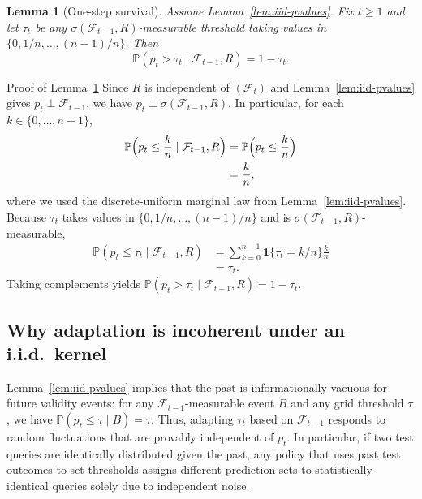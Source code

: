 \documentclass{uai2026} %
\newtheorem{lemma}{Lemma}
\newcommand{\1}{\mathbf{1}}
\newcommand{\ind}[1]{\mathbf{1}\{#1\}}
\newcommand{\prob}{\mathbb{P}}
\newcommand{\F}{\mathcal{F}}
\begin{document}
\begin{lemma}[One-step survival]
  \label{lem:one-step-survival}
  Assume Lemma~\ref{lem:iid-pvalues}.
  Fix $t\ge 1$ and let $\tau_{t}$ be any $\sigma(\F_{t-1},R)$-measurable threshold taking values in $\{0,1/n,\dots,(n-1)/n\}$.
  Then
  \begin{equation*}
    \prob(p_{t}>\tau_{t}\mid \F_{t-1},R)=1-\tau_{t}.
  \end{equation*}
\end{lemma}

\begin{appendixproof}{Proof of Lemma~\ref{lem:one-step-survival}}
  Since $R$ is independent of $(\F_{t})$ and Lemma~\ref{lem:iid-pvalues} gives $p_{t}\perp \F_{t-1}$, we have $p_{t}\perp \sigma(\F_{t-1},R)$.
  In particular, for each $k\in\{0,\dots,n-1\}$,
  \begin{equation*}
    \begin{aligned}
      \prob\Bigl(p_{t}\le \frac{k}{n}\mid \F_{t-1},R\Bigr)
      &=
      \prob\Bigl(p_{t}\le \frac{k}{n}\Bigr)\\
      &=
      \frac{k}{n},
    \end{aligned}
  \end{equation*}
  where we used the discrete-uniform marginal law from Lemma~\ref{lem:iid-pvalues}.
  Because $\tau_{t}$ takes values in $\{0,1/n,\dots,(n-1)/n\}$ and is $\sigma(\F_{t-1},R)$-measurable,
  \begin{equation*}
    \begin{aligned}
      \prob(p_{t}\le \tau_{t}\mid \F_{t-1},R)
      &=
      \sum_{k=0}^{n-1}\ind{\tau_{t}=k/n}\frac{k}{n}\\
      &=
      \tau_{t}.
    \end{aligned}
  \end{equation*}
  Taking complements yields $\prob(p_{t}>\tau_{t}\mid \F_{t-1},R)=1-\tau_{t}$.
\end{appendixproof}

\subsection{Why adaptation is incoherent under an i.i.d.\ kernel}
\label{sec:incoherent}

Lemma~\ref{lem:iid-pvalues} implies that the past is informationally vacuous for future validity events: for any $\F_{t-1}$-measurable event $B$ and any grid threshold $\tau$, we have $\prob(p_{t}\le\tau\mid B)=\tau$.
Thus, adapting $\tau_{t}$ based on $\F_{t-1}$ responds to random fluctuations that are provably independent of $p_{t}$.
In particular, if two test queries are identically distributed given the past, any policy that uses past test outcomes to set thresholds assigns different prediction sets to statistically identical queries solely due to independent noise.
\end{document}

